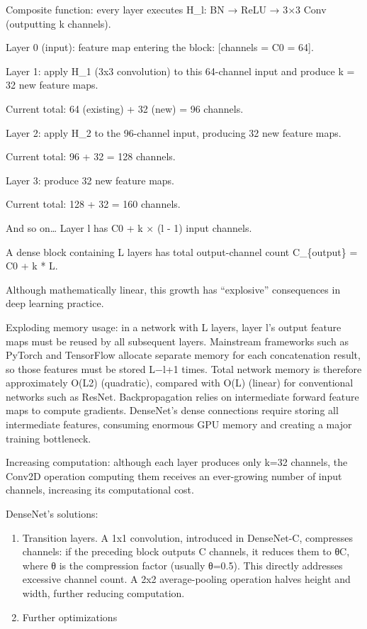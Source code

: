 Composite function: every layer executes H\_l: BN → ReLU → 3×3 Conv (outputting k channels).

Layer 0 (input): feature map entering the block: {[}channels = C0 = 64{]}.

Layer 1: apply H\_1 (3x3 convolution) to this 64-channel input and produce k = 32 new feature maps.

Current total: 64 (existing) + 32 (new) = 96 channels.

Layer 2: apply H\_2 to the 96-channel input, producing 32 new feature maps.

Current total: 96 + 32 = 128 channels.

Layer 3: produce 32 new feature maps.

Current total: 128 + 32 = 160 channels.

And so on\ldots{} Layer l has C0 + k × (l - 1) input channels.

A dense block containing L layers has total output-channel count C\_\{output\} = C0 + k * L.

Although mathematically linear, this growth has ``explosive'' consequences in deep learning practice.

Exploding memory usage: in a network with L layers, layer l's output feature maps must be reused by all subsequent layers. Mainstream frameworks such as PyTorch and TensorFlow allocate separate memory for each concatenation result, so those features must be stored L−l+1 times. Total network memory is therefore approximately O(L2) (quadratic), compared with O(L) (linear) for conventional networks such as ResNet. Backpropagation relies on intermediate forward feature maps to compute gradients. DenseNet's dense connections require storing all intermediate features, consuming enormous GPU memory and creating a major training bottleneck.

Increasing computation: although each layer produces only k=32 channels, the Conv2D operation computing them receives an ever-growing number of input channels, increasing its computational cost.

DenseNet's solutions:

\begin{enumerate}
\def\labelenumi{\arabic{enumi}.}
\item
  Transition layers. A 1x1 convolution, introduced in DenseNet-C, compresses channels: if the preceding block outputs C channels, it reduces them to θC, where θ is the compression factor (usually θ=0.5). This directly addresses excessive channel count. A 2x2 average-pooling operation halves height and width, further reducing computation.
\item
  Further optimizations
\end{enumerate}

